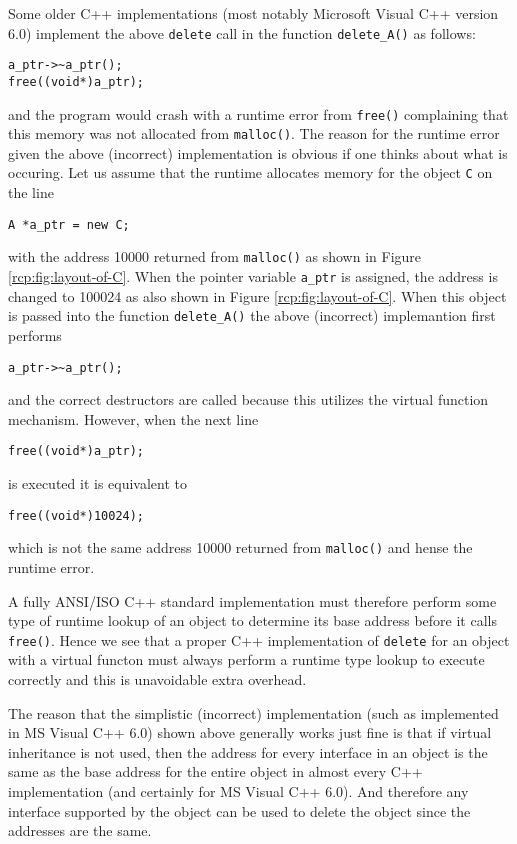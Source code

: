 Some older C++ implementations (most notably Microsoft Visual C++
version 6.0) implement the above \texttt{delete} call in the function
\texttt{delete\_A()} as follows:
%
{\small\begin{verbatim}a_ptr->~a_ptr();
free((void*)a_ptr);
\end{verbatim}}
%
\noindent{}and the program would crash with a runtime error from \texttt{free()}
complaining that this memory was not allocated from \texttt{malloc()}.
The reason for the runtime error given the above (incorrect)
implementation is obvious if one thinks about what is occuring.  Let
us assume that the runtime allocates memory for the object \texttt{C}
on the line
%
{\small\begin{verbatim}
A *a_ptr = new C;
\end{verbatim}}
%
\noindent{}with the address 10000 returned from \texttt{malloc()}
as shown in Figure \ref{rcp:fig:layout-of-C}.  When the pointer
variable \texttt{a\_ptr} is assigned, the address is changed to 100024
as also shown in Figure \ref{rcp:fig:layout-of-C}.  When this object
is passed into the function \texttt{delete\_A()} the above
(incorrect) implemantion first performs
%
{\small\begin{verbatim}
a_ptr->~a_ptr();
\end{verbatim}}
%
\noindent{}and the correct destructors are
called because this utilizes the virtual function mechanism.  However,
when the next line
%
{\small\begin{verbatim}
free((void*)a_ptr);
\end{verbatim}}
%
\noindent{}is executed it is equivalent to
%
{\small\begin{verbatim}
free((void*)10024);
\end{verbatim}}
%
\noindent{}which is not the same address 10000 returned from \texttt{malloc()}
and hense the runtime error.

A fully ANSI/ISO C++ standard implementation must therefore perform
some type of runtime lookup of an object to determine its base address
before it calls \texttt{free()}.  Hence we see that a proper C++
implementation of \texttt{delete} for an object with a virtual functon
must always perform a runtime type lookup to execute correctly and
this is unavoidable extra overhead.

The reason that the simplistic (incorrect) implementation (such as
implemented in MS Visual C++ 6.0) shown above generally works just
fine is that if virtual inheritance is not used, then the address for
every interface in an object is the same as the base address for the
entire object in almost every C++ implementation (and certainly for MS
Visual C++ 6.0).  And therefore any interface supported by the object
can be used to delete the object since the addresses are the same.

